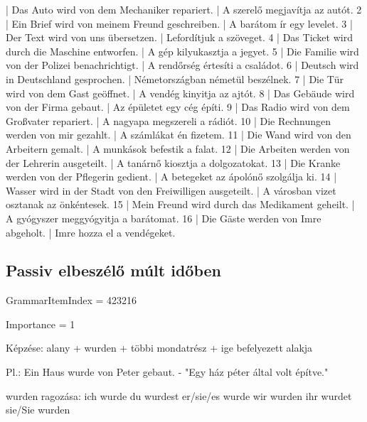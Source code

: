 \documentclass{article}
\newenvironment{desc}{\verbatim}{\endverbatim}
\newenvironment{exmp}{\verbatim}{\endverbatim}
\begin{document}
\begin{exmp}
1 | Das Auto wird von dem Mechaniker repariert. | A szerelő megjavítja az autót.
2 | Ein Brief wird von meinem Freund geschreiben. | A barátom ír egy levelet.
3 | Der Text wird von uns übersetzen. | Lefordítjuk a szöveget.
4 | Das Ticket wird durch die Maschine entworfen. | A gép kilyukasztja a jegyet.
5 | Die Familie wird von der Polizei benachrichtigt. | A rendőrség értesíti a családot.
6 | Deutsch wird in Deutschland gesprochen. | Németországban németül beszélnek.
7 | Die Tür wird von dem Gast geöffnet. | A vendég kinyitja az ajtót.
8 | Das Gebäude wird von der Firma gebaut. | Az épületet egy cég építi.
9 | Das Radio wird von dem Großvater repariert. | A nagyapa megszereli a rádiót.
10 | Die Rechnungen werden von mir gezahlt. | A számlákat én fizetem.
11 | Die Wand wird von den Arbeitern gemalt. | A munkások befestik a falat.
12 | Die Arbeiten werden von der Lehrerin ausgeteilt. | A tanárnő kiosztja a dolgozatokat.
13 | Die Kranke werden von der Pflegerin gedient. | A betegeket az ápolónő szolgálja ki.
14 | Wasser wird in der Stadt von den Freiwilligen ausgeteilt. | A városban vizet osztanak az önkéntesek.
15 | Mein Freund wird durch das Medikament geheilt. | A gyógyszer meggyógyitja a barátomat.
16 | Die Gäste werden von Imre abgeholt. | Imre hozza el a vendégeket.
\end{exmp}

\subsection{Passiv elbeszélő múlt időben}

GrammarItemIndex = 423216

Importance = 1

\begin{desc}
Képzése: alany + wurden + többi mondatrész + ige befelyezett alakja

Pl.: Ein Haus wurde von Peter gebaut. - "Egy ház péter által volt építve."

wurden ragozása:
ich wurde
du wurdest
er/sie/es wurde
wir wurden
ihr wurdet
sie/Sie wurden
\end{desc}
\end{document}
